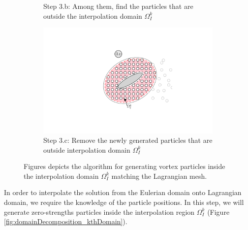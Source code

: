 \begin{figure}[p]
\begin{subfigure}[t]{0.55\textwidth}
			\caption{Step 3.b: Among them, find the particles that are outside the interpolation domain $\Omega_{I}^k$}
			\label{fig:generateParticles_part2}
		 \end{subfigure}%
		 \quad
	     \begin{subfigure}[t]{0.55\textwidth}
			\includegraphics[trim=8.05cm 2.85cm 5.4cm 3.05cm, clip, width=0.9\linewidth]{./figures/coupling/generateParticles/generateParticles_part3.pdf}
			\caption{Step 3.c: Remove the newly generated particles that are outside interpolation domain $\Omega_{I}^k$}
			\label{fig:generateParticles_part3}
		 \end{subfigure}%
	
	     \caption{Figures depicts the algorithm for generating vortex particles inside the interpolation domain $\Omega_{I}^k$ matching the Lagrangian mesh.}
	     \label{fig:generateParticles}
		\end{figure}	
	
	In order to interpolate the solution from the Eulerian domain onto Lagrangian domain, we require the knowledge of the particle positions. In this step, we will generate zero-strengths particles inside the interpolation region $\Omega_I^k$ (Figure \ref{fig:domainDecomposition_kthDomain}).
	
